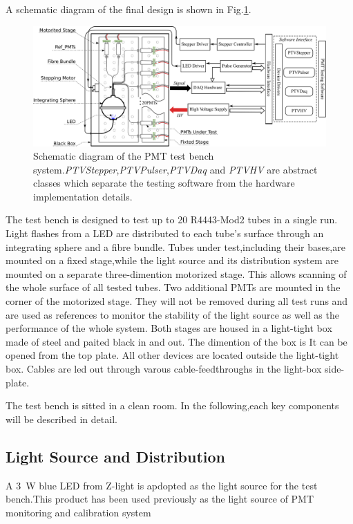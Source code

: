 \documentclass[preprint,5p,times]{elsarticle}
\begin{document}
A schematic diagram of the final design is shown in Fig.\ref{fig:testbench_overveiw}.
\begin{figure}[hb]
 \centering
 \includegraphics[width=140mm]{testbench_overview}
\caption{Schematic diagram of the PMT test bench system.\textit{PTVStepper},\textit{PTVPulser},\textit{PTVDaq} and \textit{PTVHV} are abstract classes which separate the testing software from the hardware implementation details.}
\label{fig:testbench_overveiw}
\end{figure}
The test bench is designed to test up to 20 R4443-Mod2 tubes in a single run.
Light flashes from a LED are distributed to each tube's surface through an integrating sphere and a fibre bundle.
Tubes under test,including their bases,are mounted on a fixed stage,while the light source and its distribution system are mounted on a separate three-dimention motorized stage.
This allows scanning of the whole surface of all tested tubes.
Two additional PMTs are mounted in the corner of the motorized stage.
They will not be removed during all test runs and are used as references to monitor the stability of the light source as well as the performance of the whole system.
Both stages are housed in a light-tight box made of steel and paited black in and out.
The dimention of the box is
It can be opened from the top plate.
All other devices are located outside the light-tight box.
Cables are led out through varous cable-feedthroughs in the light-box side-plate.

The test bench is sitted in a clean room.
In the following,each key components will be described in detail.
\subsection{Light Source and Distribution}
\label{sec:light_source}

A 3~W blue LED from Z-light\cite{zlight} is apdopted as the light source for the test bench.This product has been used previously as the light source of PMT monitoring and calibration system\cite{yuyuhong_led} 
\end{document}
